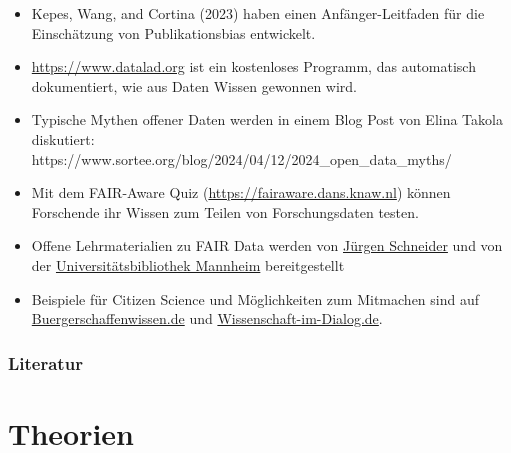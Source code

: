 \documentclass[
  letterpaper,
  DIV=11,
  numbers=noendperiod]{scrreprt}
\providecommand{\tightlist}{%
  \setlength{\itemsep}{0pt}\setlength{\parskip}{0pt}}\usepackage{longtable,booktabs,array}
\begin{document}
\begin{itemize}
\tightlist
\item
  Kepes, Wang, and Cortina (2023) haben einen Anfänger-Leitfaden für die
  Einschätzung von Publikationsbias entwickelt.
\item
  \url{https://www.datalad.org} ist ein kostenloses Programm, das
  automatisch dokumentiert, wie aus Daten Wissen gewonnen wird.
\item
  Typische Mythen offener Daten werden in einem Blog Post von Elina
  Takola diskutiert:
  https://www.sortee.org/blog/2024/04/12/2024\_open\_data\_myths/
\item
  Mit dem FAIR-Aware Quiz (\url{https://fairaware.dans.knaw.nl}) können
  Forschende ihr Wissen zum Teilen von Forschungsdaten testen.
\item
  Offene Lehrmaterialien zu FAIR Data werden von
  \href{https://j-5chneider.github.io/PTOS-open-data/}{Jürgen Schneider}
  und von der
  \href{https://github.com/UB-Mannheim/awesome-RDM}{Universitätsbibliothek
  Mannheim} bereitgestellt
\item
  Beispiele für Citizen Science und Möglichkeiten zum Mitmachen sind auf
  \href{https://www.buergerschaffenwissen.de}{Buergerschaffenwissen.de}
  und
  \href{https://wissenschaft-im-dialog.de/mitmachen/}{Wissenschaft-im-Dialog.de}.
\end{itemize}

\subsection{Literatur}\label{literatur-14}

\chapter{Theorien}\label{theorien-1}
\end{document}
